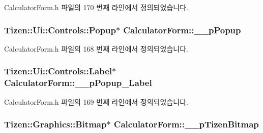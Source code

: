 Calculator\+Form.\+h 파일의 170 번째 라인에서 정의되었습니다.

\hypertarget{class_calculator_form_aa22a98e80f0533746ca5c712ea3b7a8e}{
\subsubsection[{\+\_\+\+\_\+p\+Popup}]{\setlength{\rightskip}{0pt plus 5cm}Tizen\+::\+Ui\+::\+Controls\+::\+Popup$\ast$ Calculator\+Form\+::\+\_\+\+\_\+p\+Popup\hspace{0.3cm}{\ttfamily [protected]}}}\label{class_calculator_form_aa22a98e80f0533746ca5c712ea3b7a8e}


Calculator\+Form.\+h 파일의 168 번째 라인에서 정의되었습니다.

\hypertarget{class_calculator_form_aabf0dd69d2567ee96db776f4bbe53f4e}{
\subsubsection[{\+\_\+\+\_\+p\+Popup\+\_\+\+Label}]{\setlength{\rightskip}{0pt plus 5cm}Tizen\+::\+Ui\+::\+Controls\+::\+Label$\ast$ Calculator\+Form\+::\+\_\+\+\_\+p\+Popup\+\_\+\+Label\hspace{0.3cm}{\ttfamily [protected]}}}\label{class_calculator_form_aabf0dd69d2567ee96db776f4bbe53f4e}


Calculator\+Form.\+h 파일의 169 번째 라인에서 정의되었습니다.

\hypertarget{class_calculator_form_a88ec1e4da579824a2f78534d11ffad8b}{
\subsubsection[{\+\_\+\+\_\+p\+Tizen\+Bitmap}]{\setlength{\rightskip}{0pt plus 5cm}Tizen\+::\+Graphics\+::\+Bitmap$\ast$ Calculator\+Form\+::\+\_\+\+\_\+p\+Tizen\+Bitmap\hspace{0.3cm}{\ttfamily [protected]}}}\label{class_calculator_form_a88ec1e4da579824a2f78534d11ffad8b}


